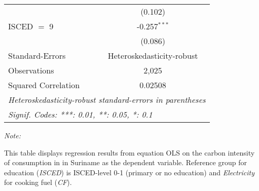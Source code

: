 \begin{table}[htbp!]
\begin{adjustbox}{width = 1\textwidth, max height = 0.95\textheight, center}
\begin{threeparttable}[b]
\begin{tabular}{lc}
                                & (0.102)\\   
            ISCED $=$ 9         & -0.257$^{***}$\\   
                                & (0.086)\\   
            \midrule 
            Standard-Errors     & Heteroskedasticity-robust \\   
            Observations        & 2,025\\  
            Squared Correlation & 0.02508\\  
            \midrule \midrule
            \multicolumn{2}{l}{\emph{Heteroskedasticity-robust standard-errors in parentheses}}\\
            \multicolumn{2}{l}{\emph{Signif. Codes: ***: 0.01, **: 0.05, *: 0.1}}\\
         \end{tabular}
         
         \begin{tablenotes}\item \medskip \textit{Note:}
            \item This table displays regression results from equation OLS on the carbon intensity of consumption in  in Suriname as the dependent variable. Reference group for education (\textit{ISCED}) is ISCED-level 0-1 (primary or no education) and \textit{Electricity} for cooking fuel (\textit{CF}).
         \end{tablenotes}
      \end{threeparttable}
   \end{adjustbox}
\end{table}


